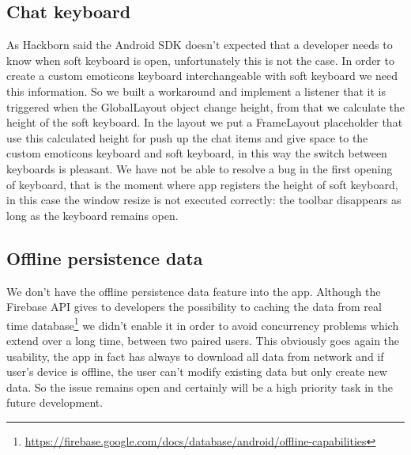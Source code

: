 \subsection{Chat keyboard}
As Hackborn said \cite{Dianne_Hackborn_keyboard} the Android SDK doesn't expected that a developer needs to know when soft keyboard is open, unfortunately this is not the case. In order to create a custom emoticons keyboard interchangeable with soft keyboard we need this information. So we built a workaround and implement a listener that it is triggered when the GlobalLayout object change height, from that we calculate the height of the soft keyboard. In the layout we put a FrameLayout placeholder that use this calculated height for push up the chat items and give space to the custom emoticons keyboard and soft keyboard, in this way the switch between keyboards is pleasant. 
We have not be able to resolve a bug in the first opening of keyboard, that is the moment where app registers the height of soft keyboard, in this case the window resize is not executed correctly: the toolbar disappears as long as the keyboard remains open.

\subsection{Offline persistence data}
We don't have the offline persistence data feature into the app. Although the Firebase API gives to developers the possibility to caching the data from real time database\footnote{\url{https://firebase.google.com/docs/database/android/offline-capabilities}} we didn't enable it in order to avoid concurrency problems which extend over a long time, between two paired users. This obviously goes again the usability, the app in fact has always to download all data from network and if user's device is offline, the user can't modify existing data but only create new data. So the issue remains open and certainly will be a high priority task in the future development.